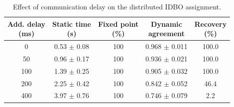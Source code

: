 \begin{table}[!t]
\centering
\footnotesize
\setlength{\tabcolsep}{1.8pt}
\caption{Effect of communication delay on the distributed IDBO assignment.}
\label{tab:idbo_delay_scalability}
\begin{tabular}{@{}ccccc@{}}
\hline\hline
\shortstack{Add. delay\\(ms)} & \shortstack{Static time\\(s)} &
\shortstack{Fixed point\\(\%)} & \shortstack{Dynamic\\agreement} &
\shortstack{Recovery\\(\%)} \\
\hline
0 & 0.53 $\pm$ 0.08 & 100 & 0.968 $\pm$ 0.011 & 100.0 \\
50 & 0.96 $\pm$ 0.17 & 100 & 0.936 $\pm$ 0.021 & 100.0 \\
100 & 1.39 $\pm$ 0.25 & 100 & 0.905 $\pm$ 0.032 & 100.0 \\
200 & 2.25 $\pm$ 0.42 & 100 & 0.842 $\pm$ 0.052 & 46.4 \\
400 & 3.97 $\pm$ 0.76 & 100 & 0.746 $\pm$ 0.079 & 2.2 \\
\hline
\end{tabular}
\end{table}
